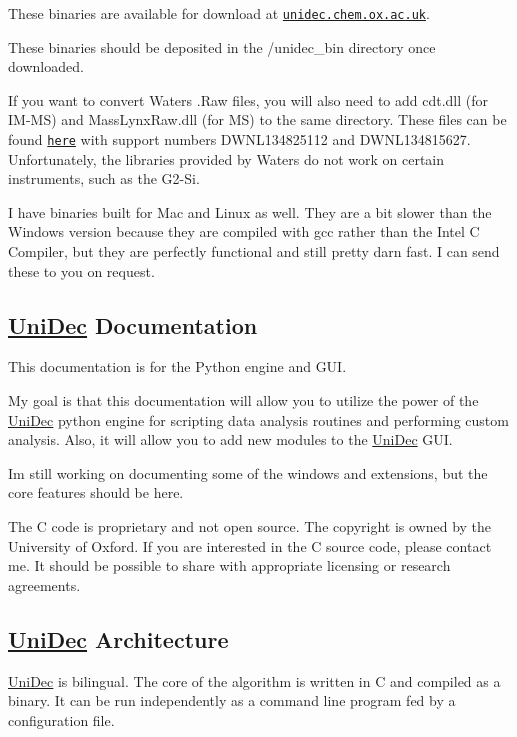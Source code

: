 These binaries are available for download at \href{http://unidec.chem.ox.ac.uk/}{\tt unidec.\+chem.\+ox.\+ac.\+uk}.

These binaries should be deposited in the /unidec\+\_\+bin directory once downloaded.

If you want to convert Waters .Raw files, you will also need to add cdt.\+dll (for I\+M-\/\+M\+S) and Mass\+Lynx\+Raw.\+dll (for M\+S) to the same directory. These files can be found \href{http://www.waters.com/waters/supportList.htm?cid=511442&locale=en_GB&filter=documenttype|DWNL&locale=en_GB}{\tt here} with support numbers D\+W\+N\+L134825112 and D\+W\+N\+L134815627. Unfortunately, the libraries provided by Waters do not work on certain instruments, such as the G2-\/\+Si.

I have binaries built for Mac and Linux as well. They are a bit slower than the Windows version because they are compiled with gcc rather than the Intel C Compiler, but they are perfectly functional and still pretty darn fast. I can send these to you on request.

\subsection*{\hyperlink{namespace_uni_dec}{Uni\+Dec} Documentation}

This documentation is for the Python engine and G\+U\+I.

My goal is that this documentation will allow you to utilize the power of the \hyperlink{namespace_uni_dec}{Uni\+Dec} python engine for scripting data analysis routines and performing custom analysis. Also, it will allow you to add new modules to the \hyperlink{namespace_uni_dec}{Uni\+Dec} G\+U\+I.

I\textquotesingle{}m still working on documenting some of the windows and extensions, but the core features should be here.

The C code is proprietary and not open source. The copyright is owned by the University of Oxford. If you are interested in the C source code, please contact me. It should be possible to share with appropriate licensing or research agreements.

\subsection*{\hyperlink{namespace_uni_dec}{Uni\+Dec} Architecture}

\hyperlink{namespace_uni_dec}{Uni\+Dec} is bilingual. The core of the algorithm is written in C and compiled as a binary. It can be run independently as a command line program fed by a configuration file.

